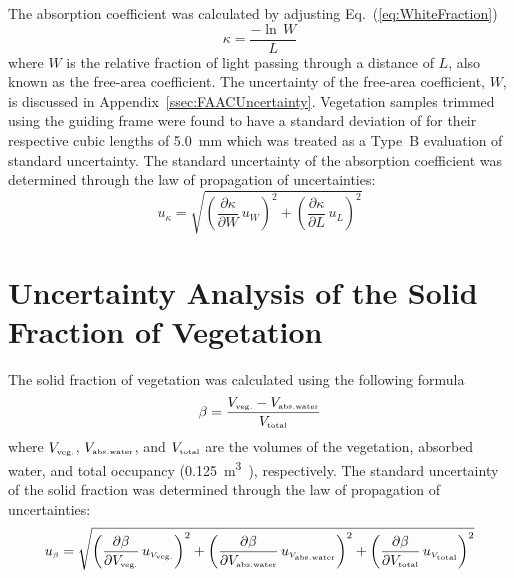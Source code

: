 \documentclass[12pt]{article}
\begin{document}
The absorption coefficient was calculated by adjusting Eq.~(\ref{eq:WhiteFraction})
\begin{equation}\label{eq:abs_coef}
\kappa = \frac {-\ln \, W}{L}
\end{equation}
where $W$ is the relative fraction of light passing through a distance of $L$, also known as the free-area coefficient. The uncertainty of the free-area coefficient, $W$, is discussed in Appendix~\ref{ssec:FAACUncertainty}.  Vegetation samples trimmed using the guiding frame were found to have a standard deviation of for their respective cubic lengths of 5.0~\si{mm} which was treated as a Type~B evaluation of standard uncertainty.  The standard uncertainty of the absorption coefficient was determined through the law of propagation of uncertainties:
\begin{equation}
\label{eq:Abs_Coef_Uncertainty}
u_{\scriptscriptstyle \kappa} = \sqrt{{\left( \frac{\partial \kappa}{\partial W}\,u_{\scriptscriptstyle W} \right) }^2+{\left(\frac{\partial \kappa}{\partial L}\,u_{\scriptscriptstyle L}\right)}^2}
\end{equation}
\pagebreak

\section{Uncertainty Analysis of the Solid Fraction of Vegetation} \label{sec:UncertaintySolidFrac}

The solid fraction of vegetation was calculated using the following formula
\begin{equation}\label{eq:Solid_Frac}
\beta = \frac {V_{\rm \scriptscriptstyle veg.}-V_{\rm \scriptscriptstyle abs.water}}{V_{\rm \scriptscriptstyle total}}
\end{equation}
where $V_{\rm \scriptscriptstyle veg.}$, $V_{\rm \scriptscriptstyle abs.water}$, and $V_{\rm \scriptscriptstyle total}$ are the volumes of the vegetation, absorbed water, and total occupancy (0.125~\si{m^3)}, respectively. The standard uncertainty of the solid fraction was determined through the law of propagation of uncertainties:
\begin{equation}
\label{eq:Solid_Frac_Uncertainty}
u_{\scriptscriptstyle \beta} = \sqrt{{\left( \frac{\partial \beta}{\partial V_{\rm \scriptscriptstyle veg.}}\,u_{\scriptscriptstyle V_{\rm \scriptscriptstyle veg.}} \right) }^2+{\left( \frac{\partial \beta}{\partial V_{\rm \scriptscriptstyle abs.water}}\,u_{\scriptscriptstyle V_{\rm \scriptscriptstyle abs.water}} \right) }^2+{\left( \frac{\partial \beta}{\partial V_{\rm \scriptscriptstyle total}}\,u_{\scriptscriptstyle V_{\rm \scriptscriptstyle total}} \right) }^2}
\end{equation}
\end{document}

